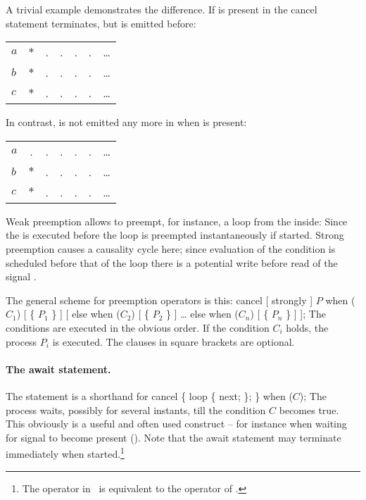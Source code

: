 A trivial example demonstrates the difference. If  is present in
%
%
the cancel statement terminates, but  is emitted before:  
\begin{center}
  \leavevmode
  \begin{tabular}[]{l@{\quad}||@{\quad} cccccc}
    \hline\hline   
    \hbox{$a$} &$*$&.&.&.&.&\ldots
   \\
    \hbox{$b$} &$*$&.&.&.&.&\ldots
   \\
    \hbox{$c$} &$*$&.&.&.&.&\ldots
    \\   
    \hline\hline
  \end{tabular}
\end{center}

In contrast,  is not emitted any more in
%
%
when  is present:
\begin{center}
  \leavevmode
  \begin{tabular}[]{l@{\quad}||@{\quad} cccccc}
    \hline\hline   
    \hbox{$a$} &.&.&.&.&.&\ldots
   \\
    \hbox{$b$} &$*$&.&.&.&.&\ldots
   \\
    \hbox{$c$} &$*$&.&.&.&.&\ldots
    \\   
    \hline\hline
  \end{tabular}
\end{center} 

Weak preemption allows to preempt, for instance, a loop from the 
inside:
%
%
Since the  is executed before  the loop is 
preempted instantaneously if started.  Strong preemption causes a
causality cycle here; since evaluation of the condition  is
scheduled before that of the loop there is a potential write before 
read of the signal .

The general scheme for preemption operators is this:
%
\BEP
cancel [ strongly ]
    $P$
when ($C_{1}$) [ \{ $P_{1}$ \} ]
[ else when ($C_{2}$) [ \{ $P_{2}$ \} ]
  \ldots
  else when ($C_{n}$) [ \{ $P_{n}$ \} ]
];
\EEP
%
The conditions are executed in the obvious order. If the condition 
$C_i$ holds, the process $P_i$ is executed. The clauses in square 
brackets are optional.

\paragraph{The await statement.}
 The statement  is a 
shorthand for
%
\BEP
cancel \{
   loop \{ next; \};
\} when ($C$);
\EEP
%
The process waits, possibly for several instants, till the condition 
$C$ becomes true. This obviously is a useful and often used construct 
-- for instance when waiting for signal to become present (). Note that the await statement may terminate immediately when 
started.\footnote{The operator  in \se\ is equivalent to 
the operator  of \esterel.} 

